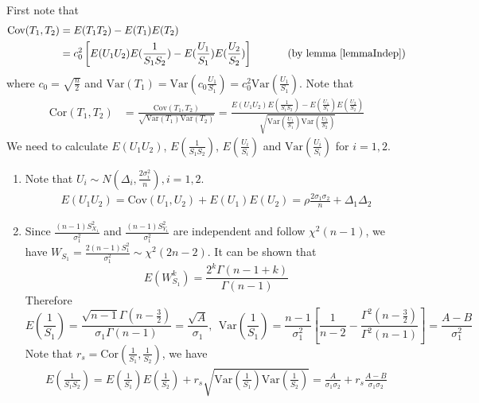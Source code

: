 \documentclass[12pt, a4paper]{article}
\begin{document}
\begin{appendix}
		
		
			First note that
			\begin{align*}
			\text{Cov}(T_1, T_2) &= E(T_1T_2) - E(T_1)E(T_2) \\
			& = c_0^2 \left[E(U_1U_2)E(\frac{1}{S_1S_2}) - E(\frac{U_1}{S_1})E( \frac{U_2}{S_2})\right]   
			~~~~~~~~~\text{ (by lemma \ref{lemmaIndep})}
			\end{align*}
			where $c_0 = \sqrt{\frac{n}{2}}$ and $\text{Var}(T_1) = \text{Var}(c_0\frac{U_1}{S_1})=
			c_0^2\text{Var}(\frac{U_1}{S_1})$. 
			Note that 
			\begin{align}\label{tttTcorrelation}
			\text{Cor}(T_1, T_2) & = \frac{\text{Cov}(T_1, T_2) }{\sqrt{\text{Var}(T_1) \text{Var}(T_2) }} =
			\frac{E(U_1U_2)E(\frac{1}{S_1S_2}) - E(\frac{U_1}{S_1})E(
				\frac{U_2}{S_2})}{\sqrt{\text{Var}(\frac{U_1}{S_1})\text{Var}(\frac{U_2}{S_2})}} 
			\end{align}
			We need to calculate $E(U_1U_2)$, $E(\frac{1}{S_1S_2})$, $ E(\frac{U_i}{S_i})$ and
			$\text{Var}(\frac{U_i}{S_i})$ for $i =1, 2$. 
			\begin{enumerate}
				\item Note that $U_i\sim N(\Delta_i, \frac{2\sigma_i^2}{n}),  i=1, 2$. 
				\begin{align}\label{eqq1}
				E(U_1U_2)= \text{Cov}(U_1, U_2) + E(U_1)E(U_2) = \rho \frac{2\sigma_1\sigma_2}{n} +
				\Delta_1\Delta_2
				\end{align} 
				\item Since $\frac{(n-1)S_{X_1}^2}{\sigma_1^2}$ and $\frac{(n-1)S_{Y_1}^2}{\sigma_1^2}$ are
				independent  and follow $\chi^2(n-1)$, we have $W_{S_1}=\frac{2(n-1)S_1^2}{\sigma_1^2}\sim
				\chi^2(2n-2)$. It can be shown that 
				\[E(W_{S_1}^k)= \frac{2^k\Gamma(n-1+k)}{\Gamma(n-1)}\] 
				Therefore 
				\[E\left(\frac{1}{S_1}\right) =
				\frac{\sqrt{n-1}\Gamma(n-\frac{3}{2})}{\sigma_1\Gamma(n-1)}=\frac{\sqrt{A}}{\sigma_1}, 
				~~\text{Var}\left(\frac{1}{S_1}\right)=\frac{n-1}{\sigma_1^2}\left[\frac{1}{n-2} -
				\frac{\Gamma^2(n-\frac{3}{2})}{\Gamma^2(n-1)}\right]=\frac{A-B}{\sigma_1^2}\]
				Note that $r_s = \text{Cor}(\frac{1}{S_1}, \frac{1}{S_2})$, we have 
				\begin{align}\label{eqq2}
				E(\frac{1}{S_1S_2})  = E(\frac{1}{S_1})E(\frac{1}{S_2}) + r_s
				\sqrt{\text{Var}(\frac{1}{S_1})\text{Var}(\frac{1}{S_2})} = \frac{A}{\sigma_1\sigma_2} + r_s
				\frac{A-B}{\sigma_1\sigma_2}

\end{align}
\end{enumerate}
\end{appendix}
\end{document}
